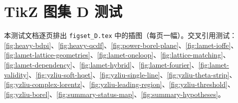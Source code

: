 

\chapter{TikZ 图集 D 测试}
本测试文档逐页排出 \texttt{figset\_D.tex} 中的插图（每页一幅）。交叉引用测试：\cref{fig:heavy-bdpi}、\cref{fig:heavy-qcdf}、\cref{fig:power-borel-plane}、\cref{fig:lamet-ioffe}、\cref{fig:lamet-lattice-geometries}、\cref{fig:lamet-oneloop}、\cref{fig:lattice-matching}、\cref{fig:lamet-dependency}、\cref{fig:lamet-hybrid}、\cref{fig:lamet-fourier}、\cref{fig:lamet-validity}、\cref{fig:yzliu-soft-hqet}、\cref{fig:yzliu-single-line}、\cref{fig:yzliu-theta-strip}、\cref{fig:yzliu-complex-lorentz}、\cref{fig:yzliu-leading-region}、\cref{fig:yzliu-threshold}、\cref{fig:yzliu-borel}、\cref{fig:summary-status-map}、\cref{fig:summary-hypotheses}。
\clearpage
\clearpage
\clearpage
\clearpage
\clearpage
\clearpage
\clearpage
\clearpage
\clearpage
\clearpage
\clearpage
\clearpage
\clearpage
\clearpage
\clearpage
\clearpage
\clearpage
\clearpage
\clearpage
\clearpage
\clearpage
